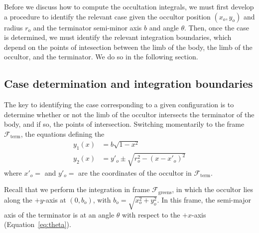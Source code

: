 \documentclass[modern]{aastex62}
\begin{document}
Before we discuss how to compute the occultation integrals, we must first
develop a procedure to identify the relevant case given the occultor
position $(x_o, y_o)$ and radius $r_o$ and the terminator semi-minor
axis $b$ and angle $\theta$. Then, once the case is determined, we must
identify the relevant integration boundaries, which depend on the points
of intesection between the limb of the body, the limb of the occultor, and
the terminator. We do so in the following section.

\subsection{Case determination and integration boundaries}
\label{sec:which-case}
%
The key to identifying the case corresponding to a given configuration is
to determine whether or not the limb of the occultor intersects the terminator
of the body, and if so, the points of intersection.
Switching momentarily to the frame $\mathcal{F}_\mathrm{term}$,
the equations defining the
\begin{align}
    y_1(x) & = b \sqrt{1 - x^2}
    \nonumber                                       \\
    y_2(x) & = y'_o \pm \sqrt{r_o^2 - (x - x'_o)^2}
\end{align}
%
where $x'_o = $ and $y'_o = $ are the coordinates of the occultor in
$\mathcal{F}_\mathrm{term}$.


Recall that we perform the integration in frame
$\mathcal{F}_\mathrm{greens}$, in which the occultor lies along the $+y$-axis
at $(0, b_o)$, with $b_o = \sqrt{x_o^2 + y_o^2}$. In this frame, the
semi-major axis of the terminator is at an angle $\theta$ with respect to the
$+x$-axis (Equation~\ref{eq:theta}).
\end{document}

